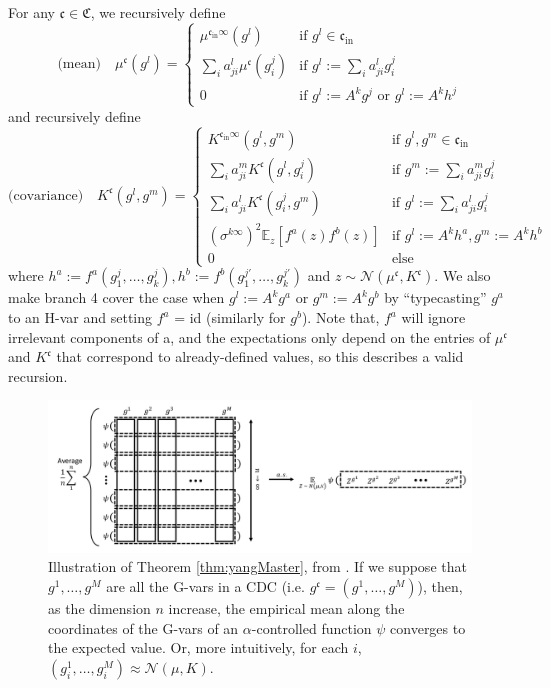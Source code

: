 \documentclass[11pt,notitlepage]{article}
\numberwithin{equation}{section}
\def\normdist{\mathcal{N}}
\theoremstyle{remark}
\theoremstyle{definition}
\begin{document}
	For any $\mathfrak{c} \in \mathfrak{C}$, we recursively define
	\begin{equation}\label{eq:mean}
	\text{(mean)} \quad \mu^{\mathfrak{c}}(g^l) =
	\begin{cases}
	\mu^{\mathfrak{c}_{\text{in}}\infty}(g^l) & \text{if } g^l \in \mathfrak{c}_{\text{in}}\\
	\sum_i a^l_{ji} \mu^{\mathfrak{c}}(g^j_i) & \text{if } g^l := \sum_i a^l_{ji} g^j_i \\
	0 & \text{if } g^l := A^k g^j \text{ or } g^l := A^k h^j
	\end{cases}
	\end{equation}
	and recursively define
	\begin{equation}\label{eq:covariance}
	\text{(covariance)} \quad K^{\mathfrak{c}}(g^l, g^m) =
	\begin{cases}
	K^{\mathfrak{c}_{\text{in}}\infty}(g^l, g^m) & \text{if } g^l, g^m \in \mathfrak{c}_{\text{in}}\\
	\sum_i a^m_{ji} K^{\mathfrak{c}}(g^l, g^j_i) & \text{if } g^m := \sum_i a^m_{ji} g^j_i \\
	\sum_i a^l_{ji} K^{\mathfrak{c}}(g^j_i, g^m) & \text{if } g^l := \sum_i a^l_{ji} g^j_i \\
	(\sigma^{k\infty})^2 \mathbb{E}_z[f^a(z)f^b(z)] & \text{if } g^l:= A^k h^a, g^m := A^k h^b \\
	0 & \text{else}
	\end{cases}
	\end{equation}
	where $h^a := f^a(g^j_1, \dots, g^j_k), h^b := f^b(g^{j'}_1, \dots, g^{j'}_k)$ and $z \sim \normdist(\mu^{\mathfrak{c}}, K^{\mathfrak{c}})$.
	We also make branch 4 cover the case when $g^l := A^k g^a$ or $g^m := A^k g^b$ by ``typecasting'' $g^a$ to an H-var and setting $f^a$ = id (similarly for $g^b$). Note that, $f^a$ will ignore irrelevant components of a, and the expectations only depend on the entries of $\mu^{\mathfrak{c}}$ and $K^{\mathfrak{c}}$ that correspond to already-defined values, so this describes a valid recursion.
	
	\begin{figure}[h!]
	\centering
	\includegraphics[width=\linewidth]{Figures/NETSOR_master_thm1.png}
	\caption{Illustration of Theorem \ref{thm:yangMaster}, from \cite{yang2019tensor}. If we suppose that $g^1, \dots, g^M$ are all the G-vars in a CDC (i.e. $g^{\mathfrak{c}} = (g^1, \dots, g^M)$), then, as the dimension $n$ increase, the empirical mean along the coordinates of the G-vars of an $\alpha$-controlled function $\psi$ converges to the expected value.
		Or, more intuitively, for each $i$, $(g^1_i, \dots, g^M_i) \approx \normdist(\mu, K)$.
	}
	\end{figure} 
	
\end{document}
